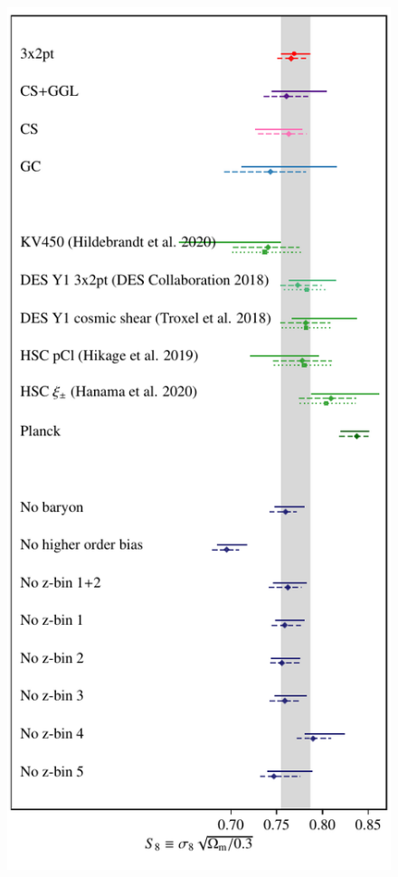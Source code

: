 \begin{figure}
	\begin{center}
		\includegraphics[width=\columnwidth]{Parameter_Plots/systematics/S8_comparison_blindC}

\end{center}
\end{figure}
